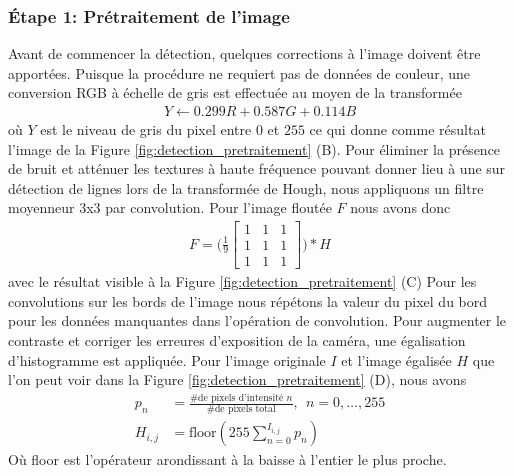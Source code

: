 \subsubsection{Étape 1: Prétraitement de l'image} Avant de commencer la détection, quelques corrections à l'image doivent être apportées. Puisque la procédure ne requiert pas de données de couleur, une conversion RGB à échelle de gris est effectuée au moyen de la transformée
\begin{align}
 Y \leftarrow 0.299 R + 0.587 G + 0.114 B
 \label{eq:rgb2gray}
\end{align}
où $Y$ est le niveau de gris du pixel entre $0$ et $255$ ce qui donne comme résultat l'image de la Figure \ref{fig:detection_pretraitement} (B). Pour éliminer la présence de bruit et atténuer les textures à haute fréquence pouvant donner lieu à une sur détection de lignes lors de la transformée de Hough, nous appliquons un filtre moyenneur 3x3 par convolution. Pour l'image floutée $F$ nous avons donc
\begin{align}
  F = \Bigg(\frac{1}{9}
    \begin{bmatrix}
      1 & 1 & 1\\
      1 & 1 & 1\\
      1 & 1 & 1
    \end{bmatrix}
  \Bigg) * H
  \label{eq:boxfilter}
\end{align}
avec le résultat visible à la Figure \ref{fig:detection_pretraitement} (C) Pour les convolutions sur les bords de l'image nous répétons la valeur du pixel du bord pour les données manquantes dans l'opération de convolution. Pour augmenter le contraste et corriger les erreures d'exposition de la caméra, une égalisation d'histogramme est appliquée. Pour l'image originale $I$ et l'image égalisée $H$ que l'on peut voir dans la Figure \ref{fig:detection_pretraitement} (D), nous avons
\begin{align}
  p_n &= \frac{\text{\# de pixels d'intensité } n }{\text{\# de pixels total}}, \ \ n = 0, \ldots, 255 \\
  H_{i,j} &= \text{floor}(255 \sum_{n=0}^{I_{i,j}} p_n)
  \label{eq:egalisation_histogramme}
\end{align}
Où floor est l'opérateur arondissant à la baisse à l'entier le plus proche.
